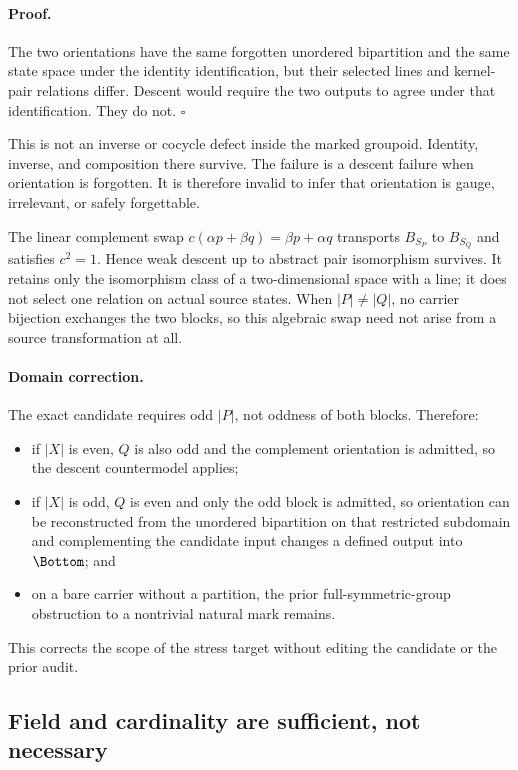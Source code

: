 \paragraph{Proof.}
The two orientations have the same forgotten unordered bipartition and the
same state space under the identity identification, but their selected lines
and kernel-pair relations differ.  Descent would require the two outputs to
agree under that identification.  They do not. \(\square\)

This is not an inverse or cocycle defect inside the marked groupoid.
Identity, inverse, and composition there survive.  The failure is a descent
failure when orientation is forgotten.  It is therefore invalid to infer
that orientation is gauge, irrelevant, or safely forgettable.

The linear complement swap \(c(\alpha p+\beta q)=\beta p+\alpha q\)
transports \(B_{S_P}\) to \(B_{S_Q}\) and satisfies \(c^2=1\).  Hence weak
descent up to abstract pair isomorphism survives.  It retains only the
isomorphism class of a two-dimensional space with a line; it does not select
one relation on actual source states.  When \(|P|\ne|Q|\), no carrier
bijection exchanges the two blocks, so this algebraic swap need not arise
from a source transformation at all.

\paragraph{Domain correction.}
The exact candidate requires odd \(|P|\), not oddness of both blocks.
Therefore:
\begin{itemize}
  \item if \(|X|\) is even, \(Q\) is also odd and the complement orientation
  is admitted, so the descent countermodel applies;
  \item if \(|X|\) is odd, \(Q\) is even and only the odd block is admitted,
  so orientation can be reconstructed from the unordered bipartition on
  that restricted subdomain and complementing the candidate input changes a
  defined output into \(\Bottom\); and
  \item on a bare carrier without a partition, the prior full-symmetric-group
  obstruction to a nontrivial natural mark remains.
\end{itemize}
This corrects the scope of the stress target without editing the candidate or
the prior audit.

\subsection{Field and cardinality are sufficient, not necessary}

